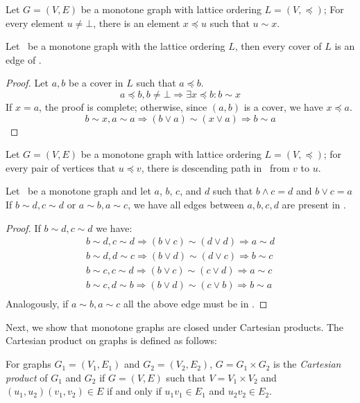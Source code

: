 \begin{cor}
Let \(G=(V,E)\) be a monotone graph with lattice ordering \(L=(V,\preceq)\); 
For every element \(u \neq \bot\),
there is an element \(x \preceq u\) such that \(u\sim x\)\@.
\end{cor}

\begin{lemma}
Let \mG\ be a monotone graph with the lattice ordering \(L\), then every cover
of \(L\) is an edge of \mG\@.
\end{lemma}

\begin{proof}
Let \(a,b\) be a cover in \(L\) such that \(a \preceq b\)\@.
\[a \preceq b, b\neq \bot \Rightarrow \exists x \preceq b: b\sim x\]
If \(x=a\), the proof is complete; otherwise, since \((a,b)\) is a cover, we have \(x\preceq a\).
\[b\sim x,a\sim a \Rightarrow (b \vee a) \sim (x \vee a) \Rightarrow b\sim a\]\@
\end{proof}

\begin{cor}
Let \(G=(V,E)\) be a monotone graph with lattice ordering \(L=(V, \preceq)\);
for every pair of vertices that \(u\preceq v\), there is descending path in \mG\ from
\(v\) to \(u\)\@. 
\end{cor}

\begin{lemma}
Let \mG\ be a monotone graph and let
\(a\), \(b\), \(c\), and \(d\) such that \(b \wedge c = d\) and \(b \vee c = a\)
If \(b\sim d, c\sim d\) or \(a\sim b, a\sim c\), we have all edges between 
\(a, b, c, d\) are present in \mG\@.
\end{lemma}

\begin{proof}
If \(b\sim d, c\sim d\) we have:
\begin{eqnarray*}
b\sim d, c\sim d \Rightarrow (b \vee c) \sim (d \vee d) \Rightarrow a\sim d\\
b\sim d, d\sim c \Rightarrow (b \vee d) \sim (d \vee c) \Rightarrow b\sim c\\
b\sim c, c\sim d \Rightarrow (b \vee c) \sim (c \vee d) \Rightarrow a\sim c\\
b\sim c, d\sim b \Rightarrow (b \vee d) \sim (c \vee b) \Rightarrow b\sim a\\
\end{eqnarray*}
Analogously, if \(a\sim b, a\sim c\) all the above edge must be in \mG\@.
\end{proof}

Next, we show that monotone graphs are closed under Cartesian products.
The Cartesian product on graphs is defined as follows:
\begin{defi} 
For graphs \(G_1=(V_1,E_1)\) and \(G_2=(V_2,E_2)\), \(G = G_1 \times G_2\)
is the \emph{Cartesian product} of \(G_1\) and \(G_2\) if \(G=(V,E)\)
such that \(V=V_1 \times V_2\) and \((u_1,u_2)(v_1,v_2) \in E\)
if and only if \(u_1v_1 \in E_1\) and \(u_2v_2 \in E_2\)\@.
\end{defi}

